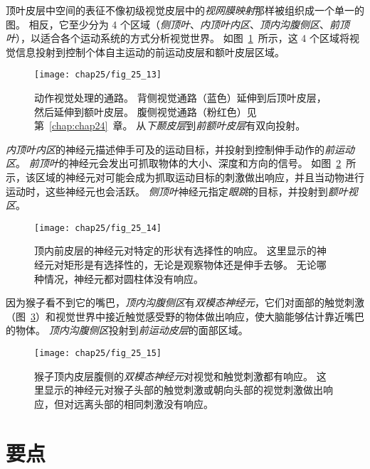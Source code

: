 顶叶皮层中空间的表征不像初级视觉皮层中的\textit{视网膜映射}那样被组织成一个单一的图。
相反，它至少分为 4 个区域（\textit{侧顶叶}、\textit{内顶叶内区}、\textit{顶内沟腹侧区}、\textit{前顶叶}），以适合各个运动系统的方式分析视觉世界。
如图~\ref{fig:25_13}~所示，这 4 个区域将视觉信息投射到控制个体自主运动的前运动皮层和额叶皮层区域。


\begin{figure}[htbp]
	\centering
	\texttt{[image: chap25/fig\_25\_13]}
	\caption{动作视觉处理的通路。
		背侧视觉通路（蓝色）延伸到后顶叶皮层，然后延伸到额叶皮层。
		腹侧视觉通路（粉红色）见第~\ref{chap:chap24}~章。
		从\textit{下颞皮层}到\textit{前额叶皮层}有双向投射。}
	\label{fig:25_13}
\end{figure}


\textit{内顶叶内区}的神经元描述伸手可及的运动目标，并投射到控制伸手动作的\textit{前运动区}。
\textit{前顶叶}的神经元会发出可抓取物体的大小、深度和方向的信号。
如图~\ref{fig:25_14}~所示，该区域的神经元对可能会成为抓取运动目标的刺激做出响应，并且当动物进行运动时，这些神经元也会活跃。
\textit{侧顶叶}神经元指定\textit{眼跳}的目标，并投射到\textit{额叶视区}。


\begin{figure}[htbp]
	\centering
	\texttt{[image: chap25/fig\_25\_14]}
	\caption{顶内前皮层的神经元对特定的形状有选择性的响应。
		这里显示的神经元对矩形是有选择性的，无论是观察物体还是伸手去够。
		无论哪种情况，神经元都对圆柱体没有响应。}
	\label{fig:25_14}
\end{figure}


因为猴子看不到它的嘴巴，\textit{顶内沟腹侧区}有\textit{双模态神经元}，它们对面部的触觉刺激（图~\ref{fig:25_15}）和视觉世界中接近触觉感受野的物体做出响应，使大脑能够估计靠近嘴巴的物体。
\textit{顶内沟腹侧区}投射到\textit{前运动皮层}的面部区域。


\begin{figure}[htbp]
	\centering
	\texttt{[image: chap25/fig\_25\_15]}
	\caption{猴子顶内皮层腹侧的\textit{双模态神经元}对视觉和触觉刺激都有响应。
		这里显示的神经元对猴子头部的触觉刺激或朝向头部的视觉刺激做出响应，但对远离头部的相同刺激没有响应。}
	\label{fig:25_15}
\end{figure}



\section{要点}

